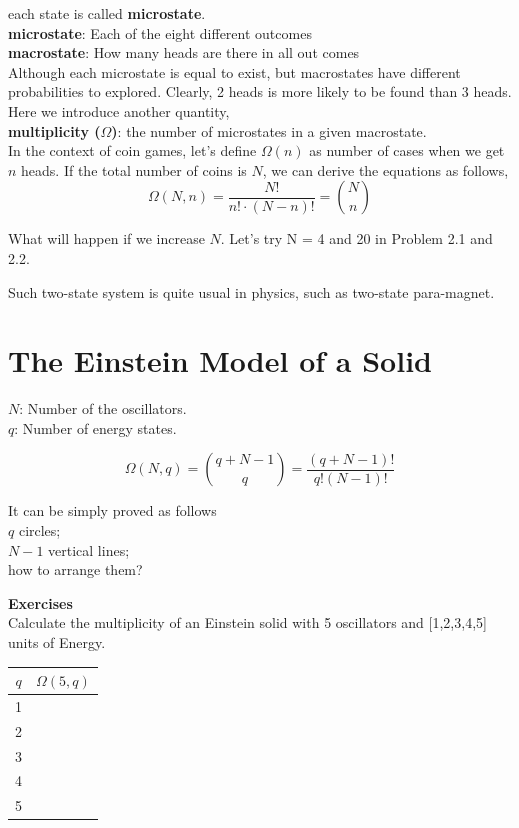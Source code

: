 each state is called {\bf microstate}.\\
{\bf microstate}: Each of the eight different outcomes\\
{\bf macrostate}: How many heads are there in all out comes\\

Although each microstate is equal to exist, but macrostates have different probabilities to explored.
Clearly, 2 heads is more likely to be found than 3 heads.
Here we introduce another quantity,\\
{\bf multiplicity ($\Omega$)}: the number of microstates in a given macrostate.\\

In the context of coin games, let's define $\Omega(n)$ as number of cases when we get $n$ heads.
If the total number of coins is $N$, we can derive the equations as follows,
\begin{equation}
 \Omega(N, n) = \frac{N!}{n!\cdot(N-n)!} = \binom{N}{n} 
\end{equation}

What will happen if we increase $N$. Let's try N = 4 and 20 in Problem 2.1 and 2.2.


Such two-state system is quite usual in physics, such as two-state para-magnet.

\section{The Einstein Model of a Solid}
$N$: Number of the oscillators.\\
$q$: Number of energy states.

\begin{equation}
 \Omega(N, q) = \binom{q+N-1}{q} = \frac{(q+N-1)!}{q!(N-1)!}
\end{equation}

It can be simply proved as follows\\
$q$ circles; \\
$N-1$ vertical lines;\\
how to arrange them? \\

{\bf Exercises}\\
Calculate the multiplicity of an Einstein solid with 5 oscillators and [1,2,3,4,5] units of Energy.\\
\begin{tabular}{c|c }
$q$ &$\Omega(5,q)$ \\\hline
 1     &  \\
 2     &  \\
 3     &  \\
 4     &  \\
 5     &  \\\hline
\end{tabular}

